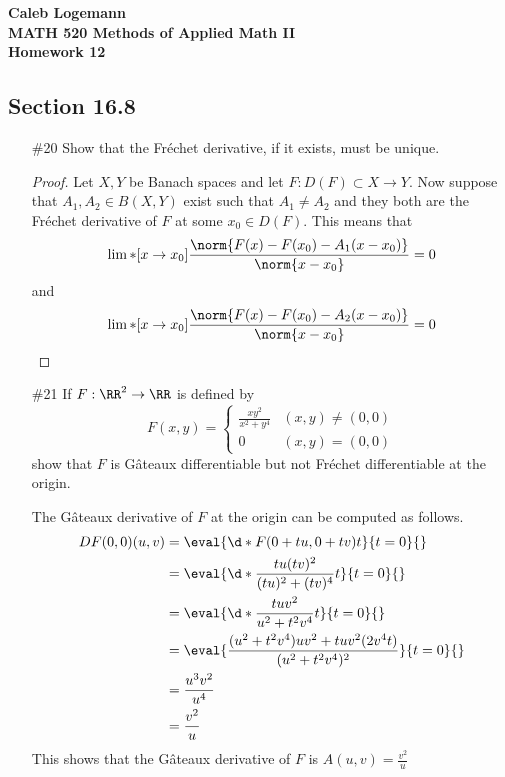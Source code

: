 \documentclass[11pt, oneside]{article}
\begin{document}
\noindent \textbf{\Large{Caleb Logemann \\
MATH 520 Methods of Applied Math II \\
Homework 12
}}

\subsection*{Section 16.8}
\begin{enumerate}
  \item[\#20]
    Show that the Fr\'echet derivative, if it exists, must be unique.

    \begin{proof}
      Let $X, Y$ be Banach spaces and let $F: D(F) \subset X \to Y$.
      Now suppose that $A_1, A_2 \in B(X, Y)$ exist such that $A_1 \neq A_2$ and
      they both are the Fr\'echet derivative of $F$ at some $x_0 \in D(F)$.
      This means that
      \[
        \lim*[x \to x_0]{\frac{\norm{F(x) - F(x_0) - A_1(x - x_0)}}{\norm{x - x_0}}} = 0
      \]
      and
      \[
        \lim*[x \to x_0]{\frac{\norm{F(x) - F(x_0) - A_2(x - x_0)}}{\norm{x - x_0}}} = 0
      \]
    \end{proof}

  \item[\#21]
    If $F: \RR^2 \to \RR$ is defined by
    \[
      F(x, y) =
      \begin{cases}
        \frac{xy^2}{x^2 + y^4} & (x, y) \neq (0, 0) \\
        0 & (x, y) = (0, 0)
      \end{cases}
    \]
    show that $F$ is G\^ateaux differentiable but not Fr\'echet differentiable
    at the origin.

    The G\^ateaux derivative of $F$ at the origin can be computed as follows.
    \begin{align*}
      DF(0, 0)(u, v) &= \eval{\d*{F(0 + tu, 0 + tv)}{t}}{t=0}{} \\
      &= \eval{\d*{\frac{tu (tv)^2}{(tu)^2 + (tv)^4}}{t}}{t = 0}{} \\
      &= \eval{\d*{\frac{t uv^2}{u^2 + t^2v^4}}{t}}{t = 0}{} \\
      &= \eval{\frac{(u^2 + t^2v^4)uv^2 + tuv^2(2v^4 t)}{(u^2 + t^2 v^4)^2}}{t = 0}{} \\
      &= \frac{u^3v^2}{u^4} \\
      &= \frac{v^2}{u}
    \end{align*}
    This shows that the G\^ateaux derivative of $F$ is $A(u, v) = \frac{v^2}{u}$


\end{enumerate}
\end{document}
